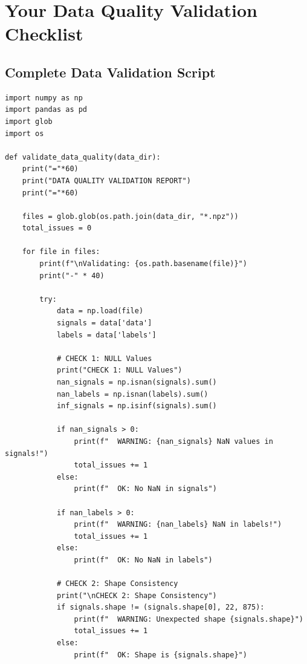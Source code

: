 \documentclass[12pt,a4paper]{article}
\begin{document}
\section{Your Data Quality Validation Checklist}

\subsection{Complete Data Validation Script}

\begin{lstlisting}[caption={Complete Validation (Your Main Task)}]
import numpy as np
import pandas as pd
import glob
import os

def validate_data_quality(data_dir):
    print("="*60)
    print("DATA QUALITY VALIDATION REPORT")
    print("="*60)
    
    files = glob.glob(os.path.join(data_dir, "*.npz"))
    total_issues = 0
    
    for file in files:
        print(f"\nValidating: {os.path.basename(file)}")
        print("-" * 40)
        
        try:
            data = np.load(file)
            signals = data['data']
            labels = data['labels']
            
            # CHECK 1: NULL Values
            print("CHECK 1: NULL Values")
            nan_signals = np.isnan(signals).sum()
            nan_labels = np.isnan(labels).sum()
            inf_signals = np.isinf(signals).sum()
            
            if nan_signals > 0:
                print(f"  WARNING: {nan_signals} NaN values in signals!")
                total_issues += 1
            else:
                print(f"  OK: No NaN in signals")
            
            if nan_labels > 0:
                print(f"  WARNING: {nan_labels} NaN in labels!")
                total_issues += 1
            else:
                print(f"  OK: No NaN in labels")
            
            # CHECK 2: Shape Consistency
            print("\nCHECK 2: Shape Consistency")
            if signals.shape != (signals.shape[0], 22, 875):
                print(f"  WARNING: Unexpected shape {signals.shape}")
                total_issues += 1
            else:
                print(f"  OK: Shape is {signals.shape}")
            

\end{lstlisting}
\end{document}

